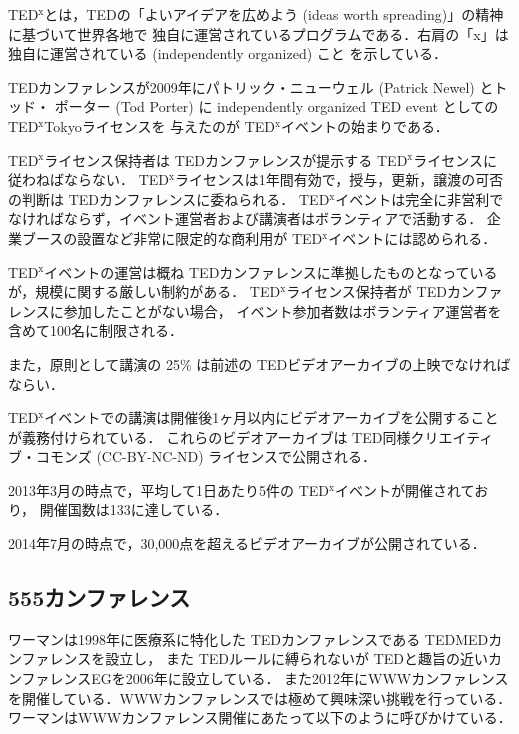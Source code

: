 \documentclass[submit,techreq,jkeyword,noauthor]{ipsj}
\newcommand{\TED}{\textrm{TED}}
\newcommand{\TEDMED}{\textrm{TEDMED}}
\newcommand{\TEDx}{\TED${}^{\textrm{x}}$}
\newcommand{\TEDxTokyo}{\TEDx\textrm{Tokyo}}
\begin{document}
\TEDx とは，\TED の「よいアイデアを広めよう (ideas worth spreading)」の精神に基づいて世界各地で
独自に運営されているプログラムである．右肩の「x」は独自に運営されている (independently organized) こと
を示している．

\TED カンファレンスが2009年にパトリック・ニューウェル (Patrick Newel) とトッド・
ポーター (Tod Porter) に independently organized TED event としての \TEDxTokyo ライセンスを
与えたのが \TEDx イベントの始まりである．

\TEDx ライセンス保持者は \TED カンファレンスが提示する \TEDx ライセンス\cite{tedxrules}に
従わねばならない．
\TEDx ライセンスは1年間有効で，授与，更新，譲渡の可否の判断は \TED カンファレンスに委ねられる．
\TEDx イベントは完全に非営利でなければならず，イベント運営者および講演者はボランティアで活動する．
企業ブースの設置など非常に限定的な商利用が \TEDx イベントには認められる．

\TEDx イベントの運営は概ね \TED カンファレンスに準拠したものとなっているが，規模に関する厳しい制約がある．
\TEDx ライセンス保持者が \TED カンファレンスに参加したことがない場合，
イベント参加者数はボランティア運営者を含めて100名に制限される．

また，原則として講演の 25\% は前述の \TED ビデオアーカイブの上映でなければならい．

\TEDx イベントでの講演は開催後1ヶ月以内にビデオアーカイブを公開することが義務付けられている．
これらのビデオアーカイブは \TED 同様クリエイティブ・コモンズ (CC-BY-NC-ND) ライセンスで公開される．

2013年3月の時点で，平均して1日あたり5件の \TEDx イベントが開催されており，
開催国数は133に達している．\cite{nh,mf}

2014年7月の時点で，30,000点を超えるビデオアーカイブが公開されている．\cite{tedxtalksweb}


\subsection{555カンファレンス}


ワーマンは1998年に医療系に特化した \TED カンファレンスである \TEDMED カンファレンスを設立し，
また \TED ルールに縛られないが \TED と趣旨の近いカンファレンスEGを2006年に設立している．
また2012年にWWWカンファレンスを開催している．WWWカンファレンスでは極めて興味深い挑戦を行っている．
ワーマンはWWWカンファレンス開催にあたって以下のように呼びかけている．\cite{wwwweb}
\end{document}

